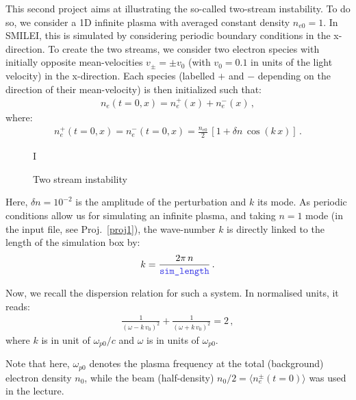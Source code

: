 \documentclass[11pt,a4paper]{article}
\newcommand{\code}[1] {{\color{classcolour}\texttt{#1}}}
\begin{document}
This second project aims at illustrating the so-called two-stream instability.
To do so, we consider a 1D infinite plasma with averaged constant density $n_{e0} = 1$. 
In SMILEI, this is simulated by considering periodic boundary conditions in the x-direction. 
To create the two streams, we consider two electron species with initially opposite mean-velocities $v_{\pm} = \pm v_0$ (with $v_0 = 0.1$ in units of the light velocity) in the x-direction.
Each species (labelled $+$ and $-$ depending on the direction of their mean-velocity) is then initialized such that:
\begin{eqnarray*}
n_e(t=0,x) = n_e^+(x) + n_e^-(x)\,,
\end{eqnarray*}
where:
\begin{eqnarray*}
n_e^+(t=0,x) = n_e^-(t=0,x) = \frac{n_{e0}}{2}\,\left[1 + \delta n\,\cos(k\,x)\right]\,.
\end{eqnarray*}

\begin{wrapfigure}[15]{r}{0.4\textwidth}
\def\svgwidth{\linewidth}

I\caption{Two stream instability}
\label{Fig_2stream}
\end{wrapfigure}

Here, $\delta n = 10^{-2}$ is the amplitude of the perturbation and $k$ its mode.
As periodic conditions allow us for simulating an infinite plasma, and taking $n=1$ mode  (in the input file, see Proj.~\ref{proj1}), the wave-number $k$ is directly linked to the length of the simulation box by:
\begin{eqnarray}\label{eq_k}
k = \frac{2\pi\,n}{\code{sim\_length}}\,.
\end{eqnarray}


Now, we recall the dispersion relation for such a system. In normalised units, it reads:
\begin{eqnarray}\label{eq_disprel_2stream}
\frac{1}{(\omega - k\,v_0)^2} + \frac{1}{(\omega + k\,v_0)^2} = 2\,,
\end{eqnarray}
where $k$ is in unit of $\omega_{p0}/c$ and $\omega$ is in units of $\omega_{p0}$.


Note that here, $\omega_{p0}$ denotes the plasma frequency at the total (background) electron density $n_0$, while the beam (half-density) $n_0/2 = \langle n_e^{\pm}(t=0) \rangle$ was used in the lecture.
\end{document}
